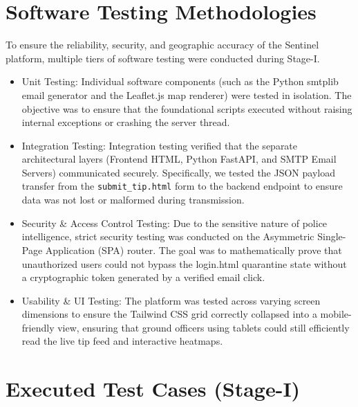 \documentclass[12pt,a4paper]{report}
\begin{document}
\section{Software Testing Methodologies}
To ensure the reliability, security, and geographic accuracy of the Sentinel platform, multiple tiers of software testing were conducted during Stage-I.
\begin{itemize}
    \item Unit Testing: Individual software components (such as the Python smtplib email generator and the Leaflet.js map renderer) were tested in isolation. The objective was to ensure that the foundational scripts executed without raising internal exceptions or crashing the server thread.
    \item Integration Testing: Integration testing verified that the separate architectural layers (Frontend HTML, Python FastAPI, and SMTP Email Servers) communicated securely. Specifically, we tested the JSON payload transfer from the \texttt{submit\_tip.html} form to the backend endpoint to ensure data was not lost or malformed during transmission.
    \item Security \& Access Control Testing: Due to the sensitive nature of police intelligence, strict security testing was conducted on the Asymmetric Single-Page Application (SPA) router. The goal was to mathematically prove that unauthorized users could not bypass the login.html quarantine state without a cryptographic token generated by a verified email click.
    \item Usability \& UI Testing: The platform was tested across varying screen dimensions to ensure the Tailwind CSS grid correctly collapsed into a mobile-friendly view, ensuring that ground officers using tablets could still efficiently read the live tip feed and interactive heatmaps.
\end{itemize}

\section{Executed Test Cases (Stage-I)}
\end{document}
